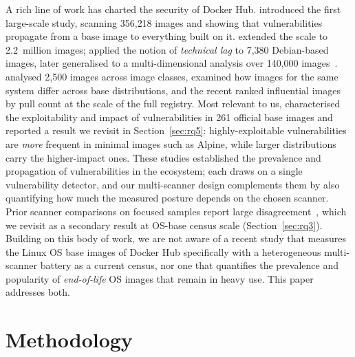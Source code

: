 \documentclass[12pt]{article}
\begin{document}
A rich line of work has charted the security of Docker Hub. \cite{shu2017dockerhub}
introduced the first large-scale study, scanning 356{,}218 images and showing
that vulnerabilities propagate from a base image to everything built on it.
\cite{liu2020understanding} extended the scale to 2.2~million images;
\cite{zerouali2019outdated} applied the notion of \emph{technical lag} to
7{,}380 Debian-based images, later generalised to a multi-dimensional analysis
over 140{,}000 images~\cite{zerouali2021techlag}. \cite{wist2021vulnerability}
analysed 2{,}500 images across image classes, \cite{ibrahim2020toomany} examined
how images for the same system differ across base distributions, and the recent
\cite{shi2025drdocker} ranked influential images by pull count at the scale of
the full registry. Most relevant to us, \cite{haque2022wellbegun} characterised
the exploitability and impact of vulnerabilities in 261 official base images and
reported a result we revisit in Section~\ref{sec:rq5}: highly-exploitable
vulnerabilities are \emph{more} frequent in minimal images such as Alpine, while
larger distributions carry the higher-impact ones. These studies established the
prevalence and propagation of vulnerabilities in the ecosystem; each draws on a
single vulnerability detector, and our multi-scanner design complements them by
also quantifying how much the measured posture depends on the chosen scanner.
Prior scanner comparisons on focused samples report large
disagreement~\cite{boles2024deciphering,bufalino2025sbomproof}, which we revisit
as a secondary result at OS-base census scale (Section~\ref{sec:rq3}).
Building on this body of work, we are not aware of a recent study that measures
the Linux OS base images of Docker Hub specifically with a heterogeneous
multi-scanner battery as a current census, nor one that quantifies the
prevalence and popularity of \emph{end-of-life} OS images that remain in heavy
use. This paper addresses both.

\section{Methodology}
\label{sec:method}
\end{document}
